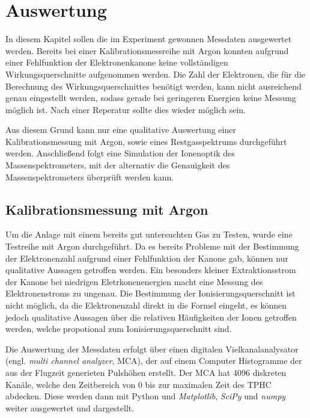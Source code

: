 \chapter{Auswertung}
\label{chap:Auswertung}
In diesem Kapitel sollen die im Experiment gewonnen Messdaten ausgewertet werden. Bereits bei einer Kalibrationsmessreihe mit Argon konnten aufgrund einer Fehlfunktion der Elektronenkanone keine vollständigen Wirkungsquerschnitte aufgenommen werden. Die Zahl der Elektronen, die für die Berechnung des Wirkungsquerschnittes benötigt werden, kann nicht ausreichend genau eingestellt werden, sodass gerade bei geringeren Energien keine Messung möglich ist. Nach einer Reperatur sollte dies wieder möglich sein. 

Aus diesem Grund kann nur eine qualitative Auswertung einer Kalibrationsmessung mit Argon, sowie eines Restgasspektrums durchgeführt werden. Anschließend folgt eine Simulation der Ionenoptik des Massenspektrometers, mit der alternativ die Genauigkeit des Massenspektrometers überprüft werden kann.

\section{Kalibrationsmessung mit Argon}
Um die Anlage mit einem bereits gut untersuchten Gas zu Testen, wurde eine Testreihe mit Argon durchgeführt. Da es bereits Probleme mit der Bestimmung der Elektronenzahl aufgrund einer Fehlfunktion der Kanone gab, können nur qualitative Aussagen getroffen werden. Ein besonders kleiner Extraktionsstrom der Kanone bei niedrigen Eletrkonenenergien macht eine Messung des Elektronenstroms zu ungenau. Die Bestimmung der Ionisierungsquerschnitt ist nicht möglich, da die Elektronenzahl direkt in die Formel eingeht, es können jedoch qualitative Aussagen über die relativen Häufigkeiten der Ionen getroffen werden, welche propotional zum Ionisierungsquerschnitt sind.

Die Auswertung der Messdaten erfolgt über einen digitalen Vielkanalanalysator (engl. \textit{multi channel analyzer}, MCA), der auf einem Computer Histogramme der aus der Flugzeit generieten Pulshöhen erstellt. Der MCA hat 4096 diskreten Kanäle, welche den Zeitbereich von 0 bis zur maximalen Zeit des TPHC abdecken. Diese werden dann mit Python und \textit{Matplotlib}, \textit{SciPy} und \textit{numpy} weiter ausgewertet und dargestellt. 

